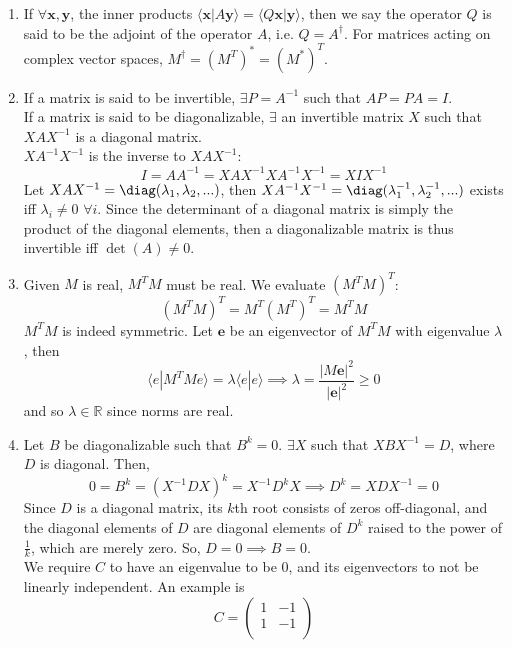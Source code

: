 \documentclass[a4paper]{article}
\begin{document}
\begin{ans}\leavevmode
\begin{enumerate}[label=(\alph*)]
\item If $\forall\mathbf{x},\mathbf{y}$, the inner products $\langle\mathbf{x}|A\mathbf{y}\rangle=\langle Q\mathbf{x}|\mathbf{y}\rangle$, then we say the operator $Q$ is said to be the adjoint of the operator $A$, i.e. $Q=A^\dag$. For matrices acting on complex vector spaces, $M^\dag=(M^T)^*=(M^*)^T$.
\item If a matrix is said to be invertible, $\exists P=A^{-1}$ such that $AP=PA=I$.\\[5pt]
If a matrix is said to be diagonalizable, $\exists$ an invertible matrix $X$ such that $XAX^{-1}$ is a diagonal matrix.\\[5pt]
$XA^{-1}X^{-1}$ is the inverse to $XAX^{-1}$:
$$I=AA^{-1}=XAX^{-1}XA^{-1}X^{-1}=XIX^{-1}$$
Let $XAX^{-1}=\diag(\lambda_1,\lambda_2,...)$, then $XA^{-1}X^{-1}=\diag(\lambda_1^{-1},\lambda_2^{-1},...)$ exists iff $\lambda_i\neq 0$ $\forall i$. Since the determinant of a diagonal matrix is simply the product of the diagonal elements, then a diagonalizable matrix is thus invertible iff $\det(A)\neq 0$.
\item Given $M$ is real, $M^TM$ must be real. We evaluate $(M^TM)^T$:
$$(M^TM)^T=M^T(M^T)^T=M^TM$$
$M^TM$ is indeed symmetric. Let $\mathbf{e}$ be an eigenvector of $M^TM$ with eigenvalue $\lambda$, then
$$\langle e|M^TMe\rangle=\lambda\langle e|e\rangle\implies\lambda=\frac{|M\mathbf{e}|^2}{|\mathbf{e}|^2}\geq0$$
and so $\lambda\in\mathbb{R}$ since norms are real.
\item Let $B$ be diagonalizable such that $B^k=0$. $\exists X$ such that $XBX^{-1}=D$, where $D$ is diagonal. Then,
$$0=B^k=(X^{-1}DX)^k=X^{-1}D^kX\implies D^k=XDX^{-1}=0$$
Since $D$ is a diagonal matrix, its $k$th root consists of zeros off-diagonal, and the diagonal elements of $D$ are diagonal elements of $D^k$ raised to the power of $\frac{1}{k}$, which are merely zero. So, $D=0\implies B=0$.\\[5pt]
We require $C$ to have an eigenvalue to be 0, and its eigenvectors to not be linearly independent. An example is
$$C=\begin{pmatrix}1&-1\\1&-1\\\end{pmatrix}$$
\end{enumerate}
\end{ans}
\newpage
\end{document}
